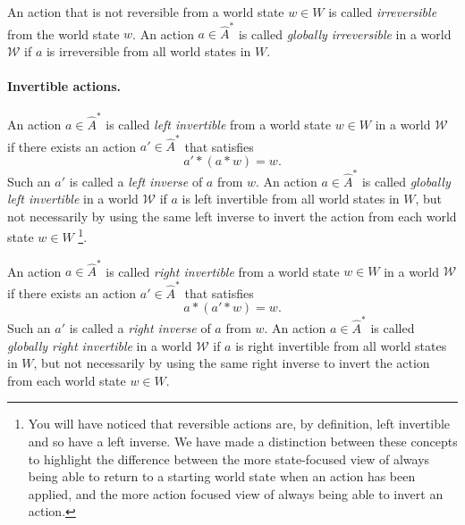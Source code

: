 An action that is not reversible from a world state $w \in W$ is called \emph{irreversible} from the world state $w$.
An action $a \in \hat{A}^{*}$ is called \emph{globally irreversible} in a world $\mathscr{W}$ if $a$ is irreversible from all world states in $W$.

\paragraph{Invertible actions.}
An action $a \in \hat{A}^{*}$ is called \emph{left invertible} from a world state $w \in W$ in a world $\mathscr{W}$ if there exists an action $a' \in \hat{A}^{*}$ that satisfies
\begin{equation}
    a' \ast (a \ast w) = w.
\end{equation}
Such an $a'$ is called a \emph{left inverse} of $a$ from $w$.
An action $a \in \hat{A}^{*}$ is called \emph{globally left invertible} in a world $\mathscr{W}$ if $a$ is left invertible from all world states in $W$, but not necessarily by using the same left inverse to invert the action from each world state $w \in W$
\footnote{
You will have noticed that reversible actions are, by definition, left invertible and so have a left inverse.
We have made a distinction between these concepts to highlight the difference between the more state-focused view of always being able to return to a starting world state when an action has been applied, and the more action focused view of always being able to invert an action.
}.

An action $a \in \hat{A}^{*}$ is called \emph{right invertible} from a world state $w \in W$ in a world $\mathscr{W}$ if there exists an action $a' \in \hat{A}^{*}$ that satisfies
\begin{equation}
    a \ast (a' \ast w) = w.
\end{equation}
Such an $a'$ is called a \emph{right inverse} of $a$ from $w$.
An action $a \in \hat{A}^{*}$ is called \emph{globally right invertible} in a world $\mathscr{W}$ if $a$ is right invertible from all world states in $W$, but not necessarily by using the same right inverse to invert the action from each world state $w \in W$.

